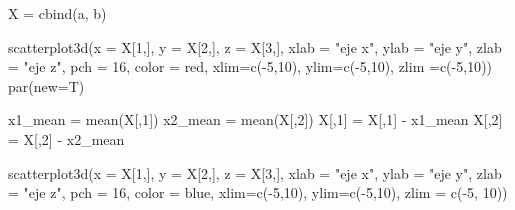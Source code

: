 \documentclass[
]{article}
\newenvironment{Shaded}{\begin{snugshade}}{\end{snugshade}}
\newcommand{\AttributeTok}[1]{\textcolor[rgb]{0.77,0.63,0.00}{#1}}
\newcommand{\DecValTok}[1]{\textcolor[rgb]{0.00,0.00,0.81}{#1}}
\newcommand{\FunctionTok}[1]{\textcolor[rgb]{0.00,0.00,0.00}{#1}}
\newcommand{\NormalTok}[1]{#1}
\newcommand{\OtherTok}[1]{\textcolor[rgb]{0.56,0.35,0.01}{#1}}
\newcommand{\SpecialCharTok}[1]{\textcolor[rgb]{0.00,0.00,0.00}{#1}}
\newcommand{\StringTok}[1]{\textcolor[rgb]{0.31,0.60,0.02}{#1}}
\begin{document}
\begin{Shaded}
\begin{Highlighting}[]
\NormalTok{X }\OtherTok{=} \FunctionTok{cbind}\NormalTok{(a, b)}

\FunctionTok{scatterplot3d}\NormalTok{(}\AttributeTok{x =}\NormalTok{ X[}\DecValTok{1}\NormalTok{,], }\AttributeTok{y =}\NormalTok{ X[}\DecValTok{2}\NormalTok{,], }\AttributeTok{z =}\NormalTok{ X[}\DecValTok{3}\NormalTok{,], }\AttributeTok{xlab =} \StringTok{"eje x"}\NormalTok{, }\AttributeTok{ylab =} \StringTok{"eje y"}\NormalTok{,}
              \AttributeTok{zlab =} \StringTok{"eje z"}\NormalTok{, }\AttributeTok{pch =} \DecValTok{16}\NormalTok{, }\AttributeTok{color =} \StringTok{\textquotesingle{}red\textquotesingle{}}\NormalTok{,}
              \AttributeTok{xlim=}\FunctionTok{c}\NormalTok{(}\SpecialCharTok{{-}}\DecValTok{5}\NormalTok{,}\DecValTok{10}\NormalTok{), }\AttributeTok{ylim=}\FunctionTok{c}\NormalTok{(}\SpecialCharTok{{-}}\DecValTok{5}\NormalTok{,}\DecValTok{10}\NormalTok{), }\AttributeTok{zlim =}\FunctionTok{c}\NormalTok{(}\SpecialCharTok{{-}}\DecValTok{5}\NormalTok{,}\DecValTok{10}\NormalTok{))}
\FunctionTok{par}\NormalTok{(}\AttributeTok{new=}\NormalTok{T)}

\NormalTok{x1\_mean }\OtherTok{=} \FunctionTok{mean}\NormalTok{(X[,}\DecValTok{1}\NormalTok{])}
\NormalTok{x2\_mean }\OtherTok{=} \FunctionTok{mean}\NormalTok{(X[,}\DecValTok{2}\NormalTok{])}
\NormalTok{X[,}\DecValTok{1}\NormalTok{] }\OtherTok{=}\NormalTok{ X[,}\DecValTok{1}\NormalTok{] }\SpecialCharTok{{-}}\NormalTok{ x1\_mean}
\NormalTok{X[,}\DecValTok{2}\NormalTok{] }\OtherTok{=}\NormalTok{ X[,}\DecValTok{2}\NormalTok{] }\SpecialCharTok{{-}}\NormalTok{ x2\_mean}

\FunctionTok{scatterplot3d}\NormalTok{(}\AttributeTok{x =}\NormalTok{ X[}\DecValTok{1}\NormalTok{,], }\AttributeTok{y =}\NormalTok{ X[}\DecValTok{2}\NormalTok{,], }\AttributeTok{z =}\NormalTok{ X[}\DecValTok{3}\NormalTok{,], }\AttributeTok{xlab =} \StringTok{"eje x"}\NormalTok{, }\AttributeTok{ylab =} \StringTok{"eje y"}\NormalTok{,}
              \AttributeTok{zlab =} \StringTok{"eje z"}\NormalTok{, }\AttributeTok{pch =} \DecValTok{16}\NormalTok{, }\AttributeTok{color =} \StringTok{\textquotesingle{}blue\textquotesingle{}}\NormalTok{, }
              \AttributeTok{xlim=}\FunctionTok{c}\NormalTok{(}\SpecialCharTok{{-}}\DecValTok{5}\NormalTok{,}\DecValTok{10}\NormalTok{), }\AttributeTok{ylim=}\FunctionTok{c}\NormalTok{(}\SpecialCharTok{{-}}\DecValTok{5}\NormalTok{,}\DecValTok{10}\NormalTok{), }\AttributeTok{zlim =} \FunctionTok{c}\NormalTok{(}\SpecialCharTok{{-}}\DecValTok{5}\NormalTok{, }\DecValTok{10}\NormalTok{))}
\end{Highlighting}
\end{Shaded}
\end{document}
